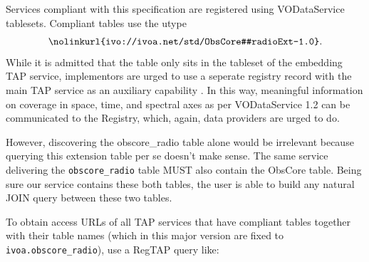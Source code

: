 \documentclass[11pt,a4paper]{ivoa}
\begin{document}
Services compliant with this specification are registered using
VODataService \citep{2021ivoa.spec.1102D} tablesets. 
Compliant tables use the utype
$$
\hbox{\nolinkurl{ivo://ivoa.net/std/ObsCore#radioExt-1.0}.}
$$
%
While it is admitted that the table only sits in the tableset of the
embedding TAP service, implementors are urged to use a seperate registry
record with the main TAP service as an auxiliary capability
\citep{2019ivoa.spec.0520D}. In this way, meaningful information
on coverage in space, time, and spectral axes as per VODataService 1.2 can
be communicated to the Registry, which, again, data providers are urged
to do.


However, discovering the obscore\_radio table alone would be  irrelevant  because querying this
extension table per se doesn't make sense. The same service delivering the \verb|obscore_radio| table 
MUST also contain the ObsCore table.   
Being sure our service  contains these both tables,
the user is able  to  build any natural JOIN query between these two tables. 





To obtain access URLs of all TAP services that have compliant tables
together with their table names (which in this major version are fixed
to \verb|ivoa.obscore_radio|), use a RegTAP \citep{2019ivoa.spec.1011D}
query like:
\end{document}
